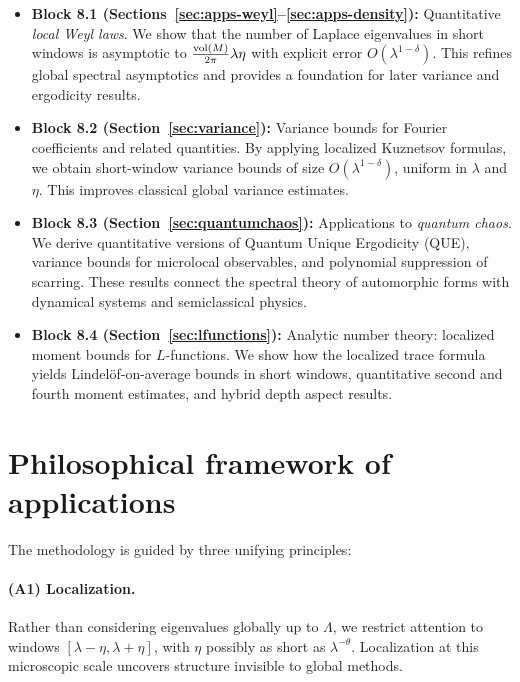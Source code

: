 \begin{itemize}
\item \textbf{Block 8.1 (Sections~\ref{sec:apps-weyl}--\ref{sec:apps-density}):}  
Quantitative \emph{local Weyl laws}. We show that the number of Laplace eigenvalues in short windows is asymptotic to $\tfrac{\operatorname{vol}(M)}{2\pi}\lambda\eta$ with explicit error $O(\lambda^{1-\delta})$. This refines global spectral asymptotics and provides a foundation for later variance and ergodicity results.

\item \textbf{Block 8.2 (Section~\ref{sec:variance}):}  
Variance bounds for Fourier coefficients and related quantities. By applying localized Kuznetsov formulas, we obtain short-window variance bounds of size $O(\lambda^{1-\delta})$, uniform in $\lambda$ and $\eta$. This improves classical global variance estimates.

\item \textbf{Block 8.3 (Section~\ref{sec:quantumchaos}):}  
Applications to \emph{quantum chaos}. We derive quantitative versions of Quantum Unique Ergodicity (QUE), variance bounds for microlocal observables, and polynomial suppression of scarring. These results connect the spectral theory of automorphic forms with dynamical systems and semiclassical physics.

\item \textbf{Block 8.4 (Section~\ref{sec:lfunctions}):}  
Analytic number theory: localized moment bounds for $L$-functions. We show how the localized trace formula yields Lindelöf-on-average bounds in short windows, quantitative second and fourth moment estimates, and hybrid depth aspect results.
\end{itemize}

\section{Philosophical framework of applications}

The methodology is guided by three unifying principles:

\paragraph{(A1) Localization.}  
Rather than considering eigenvalues globally up to $\Lambda$, we restrict attention to windows $[\lambda-\eta,\lambda+\eta]$, with $\eta$ possibly as short as $\lambda^{-\theta}$. Localization at this microscopic scale uncovers structure invisible to global methods.


